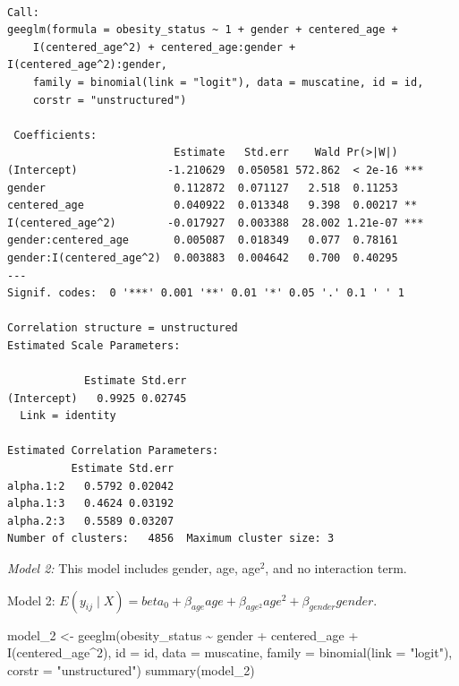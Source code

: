 \documentclass[
  letterpaper,
  DIV=11,
  numbers=noendperiod]{scrreprt}
\newenvironment{Shaded}{\begin{snugshade}}{\end{snugshade}}
\newcommand{\AttributeTok}[1]{\textcolor[rgb]{0.40,0.45,0.13}{#1}}
\newcommand{\DecValTok}[1]{\textcolor[rgb]{0.68,0.00,0.00}{#1}}
\newcommand{\FunctionTok}[1]{\textcolor[rgb]{0.28,0.35,0.67}{#1}}
\newcommand{\NormalTok}[1]{\textcolor[rgb]{0.00,0.23,0.31}{#1}}
\newcommand{\OtherTok}[1]{\textcolor[rgb]{0.00,0.23,0.31}{#1}}
\newcommand{\SpecialCharTok}[1]{\textcolor[rgb]{0.37,0.37,0.37}{#1}}
\newcommand{\StringTok}[1]{\textcolor[rgb]{0.13,0.47,0.30}{#1}}
\begin{document}
\begin{verbatim}

Call:
geeglm(formula = obesity_status ~ 1 + gender + centered_age + 
    I(centered_age^2) + centered_age:gender + I(centered_age^2):gender, 
    family = binomial(link = "logit"), data = muscatine, id = id, 
    corstr = "unstructured")

 Coefficients:
                          Estimate   Std.err    Wald Pr(>|W|)    
(Intercept)              -1.210629  0.050581 572.862  < 2e-16 ***
gender                    0.112872  0.071127   2.518  0.11253    
centered_age              0.040922  0.013348   9.398  0.00217 ** 
I(centered_age^2)        -0.017927  0.003388  28.002 1.21e-07 ***
gender:centered_age       0.005087  0.018349   0.077  0.78161    
gender:I(centered_age^2)  0.003883  0.004642   0.700  0.40295    
---
Signif. codes:  0 '***' 0.001 '**' 0.01 '*' 0.05 '.' 0.1 ' ' 1

Correlation structure = unstructured 
Estimated Scale Parameters:

            Estimate Std.err
(Intercept)   0.9925 0.02745
  Link = identity 

Estimated Correlation Parameters:
          Estimate Std.err
alpha.1:2   0.5792 0.02042
alpha.1:3   0.4624 0.03192
alpha.2:3   0.5589 0.03207
Number of clusters:   4856  Maximum cluster size: 3 
\end{verbatim}

\emph{Model 2:} This model includes gender, age, age\(^2\), and no
interaction term.

Model 2:
\(E(y_{ij} \mid X) = beta_{0} + \beta_{age}age + \beta_{age^2}age^2 + \beta_{gender}gender\).

\begin{Shaded}
\begin{Highlighting}[]
\NormalTok{model\_2 }\OtherTok{\textless{}{-}} \FunctionTok{geeglm}\NormalTok{(obesity\_status }\SpecialCharTok{\textasciitilde{}}\NormalTok{ gender }\SpecialCharTok{+}\NormalTok{ centered\_age }\SpecialCharTok{+} \FunctionTok{I}\NormalTok{(centered\_age}\SpecialCharTok{\^{}}\DecValTok{2}\NormalTok{), }\AttributeTok{id =}\NormalTok{ id,}
    \AttributeTok{data =}\NormalTok{ muscatine, }\AttributeTok{family =} \FunctionTok{binomial}\NormalTok{(}\AttributeTok{link =} \StringTok{"logit"}\NormalTok{), }\AttributeTok{corstr =} \StringTok{"unstructured"}\NormalTok{)}
\FunctionTok{summary}\NormalTok{(model\_2)}
\end{Highlighting}
\end{Shaded}
\end{document}
